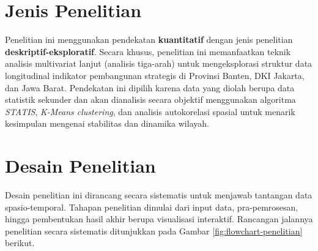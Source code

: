 \section{\normalsize Jenis Penelitian}
Penelitian ini menggunakan pendekatan \textbf{kuantitatif} dengan jenis penelitian \textbf{deskriptif-eksploratif}. Secara khusus, penelitian ini memanfaatkan teknik analisis multivariat lanjut (analisis tiga-arah) untuk mengeksplorasi struktur data longitudinal indikator pembangunan strategis di Provinsi Banten, DKI Jakarta, dan Jawa Barat. Pendekatan ini dipilih karena data yang diolah berupa data statistik sekunder dan akan dianalisis secara objektif menggunakan algoritma \textit{STATIS}, \textit{K-Means clustering}, dan analisis autokorelasi spasial untuk menarik kesimpulan mengenai stabilitas dan dinamika wilayah.

\section{\normalsize Desain Penelitian}
Desain penelitian ini dirancang secara sistematis untuk menjawab tantangan data spasio-temporal. Tahapan penelitian dimulai dari input data, pra-pemrosesan, hingga pembentukan hasil akhir berupa visualisasi interaktif. Rancangan jalannya penelitian secara sistematis ditunjukkan pada Gambar \ref{fig:flowchart-penelitian} berikut.

